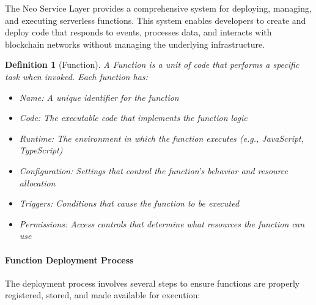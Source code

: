 \documentclass{article}
\newtheorem{definition}{Definition}
\begin{document}
The Neo Service Layer provides a comprehensive system for deploying, managing, and executing serverless functions. This system enables developers to create and deploy code that responds to events, processes data, and interacts with blockchain networks without managing the underlying infrastructure.



\begin{definition}[Function]
A Function is a unit of code that performs a specific task when invoked. Each function has:
\begin{itemize}
    \item Name: A unique identifier for the function
    \item Code: The executable code that implements the function logic
    \item Runtime: The environment in which the function executes (e.g., JavaScript, TypeScript)
    \item Configuration: Settings that control the function's behavior and resource allocation
    \item Triggers: Conditions that cause the function to be executed
    \item Permissions: Access controls that determine what resources the function can use
\end{itemize}
\end{definition}

\paragraph{Function Deployment Process}
The deployment process involves several steps to ensure functions are properly registered, stored, and made available for execution:
\end{document}
